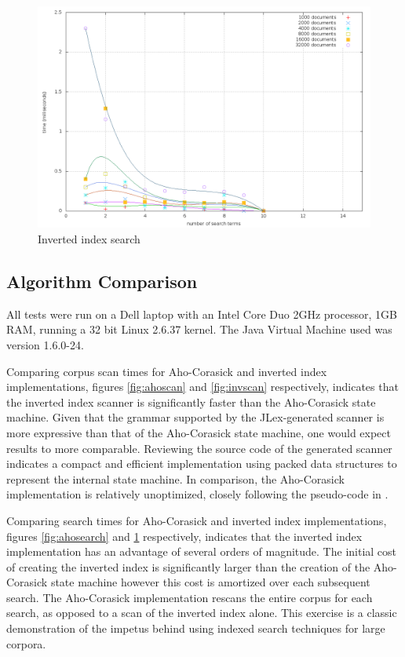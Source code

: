 \documentclass[10pt]{report}
\begin{document}
\begin{figure}
  \begin{center}
	\includegraphics[width=\textwidth,height=!]{invsearch}
  \end{center}
  \caption{Inverted index search}
  \label{fig:invsearch}
\end{figure} 

\subsection*{Algorithm Comparison}
\label{sec:algorithmcomparison}
All tests were run on a Dell laptop with an Intel Core Duo 2GHz
processor, 1GB RAM, running a 32 bit Linux 2.6.37 kernel. The Java
Virtual Machine used was version 1.6.0-24. 

Comparing corpus scan times for Aho-Corasick and inverted index
implementations, figures \ref{fig:ahoscan} and \ref{fig:invscan}
respectively, indicates that the inverted index scanner is
significantly faster than the Aho-Corasick state machine. Given that
the grammar supported by the JLex-generated scanner is more expressive
than that of the Aho-Corasick state machine, one would expect results
to more comparable. Reviewing the source code of the generated scanner
indicates a compact and efficient implementation using packed data
structures to represent the internal state machine. In comparison, the
Aho-Corasick implementation is relatively unoptimized, closely
following the pseudo-code in \cite{RefWorks:103}.

Comparing search times for Aho-Corasick and inverted index
implementations, figures \ref{fig:ahosearch} and \ref{fig:invsearch}
respectively, indicates that the inverted index implementation has an
advantage of several orders of magnitude. The initial cost of creating
the inverted index is significantly larger than the creation of the
Aho-Corasick state machine however this cost is amortized over each
subsequent search. The Aho-Corasick implementation rescans the entire
corpus for each search, as opposed to a scan of the inverted index
alone. This exercise is a classic demonstration of the impetus behind
using indexed search techniques for large corpora.





\end{document}
